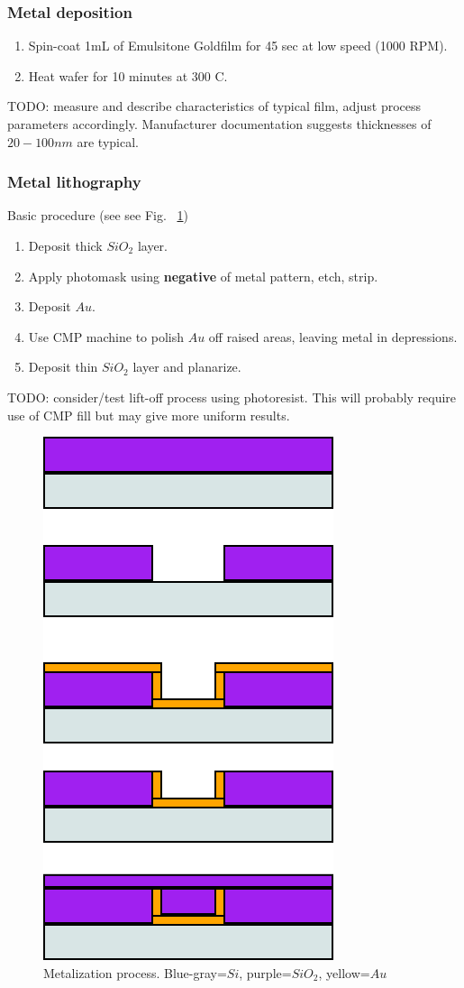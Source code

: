 \subsubsection{Metal deposition}
\begin{enumerate}
\item Spin-coat 1mL of Emulsitone Goldfilm for 45 sec at low speed (1000 RPM).
\item Heat wafer for 10 minutes at 300 C.
\end{enumerate}
TODO: measure and describe characteristics of typical film, adjust process parameters accordingly. Manufacturer documentation
suggests thicknesses of $20 - 100 nm$ are typical.

\subsubsection{Metal lithography}

Basic procedure (see see Fig. ~\ref{metal-process})
\begin{enumerate}
\item Deposit thick $SiO_2$ layer.
\item Apply photomask using {\bf negative} of metal pattern, etch, strip.
\item Deposit $Au$.
\item Use CMP machine to polish $Au$ off raised areas, leaving metal in depressions.
\item Deposit thin $SiO_2$ layer and planarize.
\end{enumerate}
TODO: consider/test lift-off process using photoresist. This will probably require use of CMP fill but may give more uniform results.

\begin{figure}[h!]
\includegraphics[scale=0.5]{images/metal-process.png}
\caption{Metalization process. Blue-gray=$Si$, purple=$SiO_2$, yellow=$Au$}
\label{metal-process}
\end{figure}
\pagebreak
